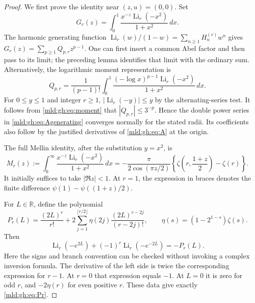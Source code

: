 \begin{proof}
We first prove the identity near $(z,u)=(0,0)$. Set
\[
 G_r(z)=\int_0^1
      \frac{x^{-z}\operatorname{Li}_r(-x^2)}{1+x^2}\,dx.
\]
The harmonic generating function
$\operatorname{Li}_r(w)/(1-w)=\sum_{n\geq1}H_n^{(r)}w^n$
gives
$G_r(z)=\sum_{p\geq1}Q_{p,r}z^{p-1}$.
One can first insert a common Abel factor and then pass to its limit;
the preceding lemma identifies that limit with the ordinary sum.
Alternatively, the logarithmic moment representation is
\begin{equation}\label{mld:gh:eq:moment}
 Q_{p,r}=\frac1{(p-1)!}\int_0^1
   \frac{(-\log x)^{p-1}\operatorname{Li}_r(-x^2)}{1+x^2}\,dx.
\end{equation}
For $0\leq y\leq1$ and integer $r\geq1$,
$|\operatorname{Li}_r(-y)|\leq y$ by the alternating-series test.
It follows from \eqref{mld:gh:eq:moment} that
$|Q_{p,r}|\leq3^{-p}$. Hence the double power series in
\eqref{mld:gh:eq:Agenerating} converges normally for the stated radii.
Its coefficients also follow by the justified derivatives of
\eqref{mld:gh:eq:A} at the origin.

The full Mellin identity, after the substitution $y=x^2$, is
\begin{equation}\label{mld:gh:eq:fullMellin}
 M_r(z):=\int_0^\infty
     \frac{x^{-z}\operatorname{Li}_r(-x^2)}{1+x^2}\,dx
 =-\frac{\pi}{2\cos(\pi z/2)}
   \left\{\zeta\left(r,\frac{1+z}{2}\right)-\zeta(r)\right\}.
\end{equation}
It initially suffices to take $|\Re z|<1$. At $r=1$, the expression
in braces denotes the finite difference
$\psi(1)-\psi((1+z)/2)$.

For $L\in\mathbb R$, define the polynomial
\begin{equation}\label{mld:gh:eq:Pr}
 P_r(L)=\frac{(2L)^r}{r!}
     +2\sum_{j=1}^{\lfloor r/2\rfloor}
       \eta(2j)\frac{(2L)^{r-2j}}{(r-2j)!},
 \qquad \eta(s)=(1-2^{1-s})\zeta(s).
\end{equation}
Then
\begin{equation}\label{mld:gh:eq:inversion}
 \operatorname{Li}_r(-e^{2L})
   +(-1)^r\operatorname{Li}_r(-e^{-2L})=-P_r(L).
\end{equation}
Here the signs and branch convention can be checked without invoking
a complex inversion formula. The derivative of the left side is twice
the corresponding expression for $r-1$. At $r=0$ that expression
equals $-1$. At $L=0$ it is zero for odd $r$, and $-2\eta(r)$ for
even positive $r$. These data give exactly \eqref{mld:gh:eq:Pr}.


\end{proof}
